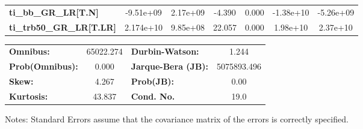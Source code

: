 \begin{center}
\begin{tabular}{lcccccc}
\textbf{ti\_bb\_GR\_LR[T.N]}            &    -9.51e+09  &     2.17e+09     &    -4.390  &         0.000        &    -1.38e+10    &    -5.26e+09     \\
\textbf{ti\_trb50\_GR\_LR[T.LR]}        &    2.174e+10  &     9.85e+08     &    22.057  &         0.000        &     1.98e+10    &     2.37e+10     \\
\bottomrule
\end{tabular}
\begin{tabular}{lclc}
\textbf{Omnibus:}       & 65022.274 & \textbf{  Durbin-Watson:     } &      1.244   \\
\textbf{Prob(Omnibus):} &    0.000  & \textbf{  Jarque-Bera (JB):  } & 5075893.496  \\
\textbf{Skew:}          &    4.267  & \textbf{  Prob(JB):          } &       0.00   \\
\textbf{Kurtosis:}      &   43.837  & \textbf{  Cond. No.          } &       19.0   \\
\bottomrule
\end{tabular}
\end{center}

Notes: \newline
 [1] Standard Errors assume that the covariance matrix of the errors is correctly specified.

